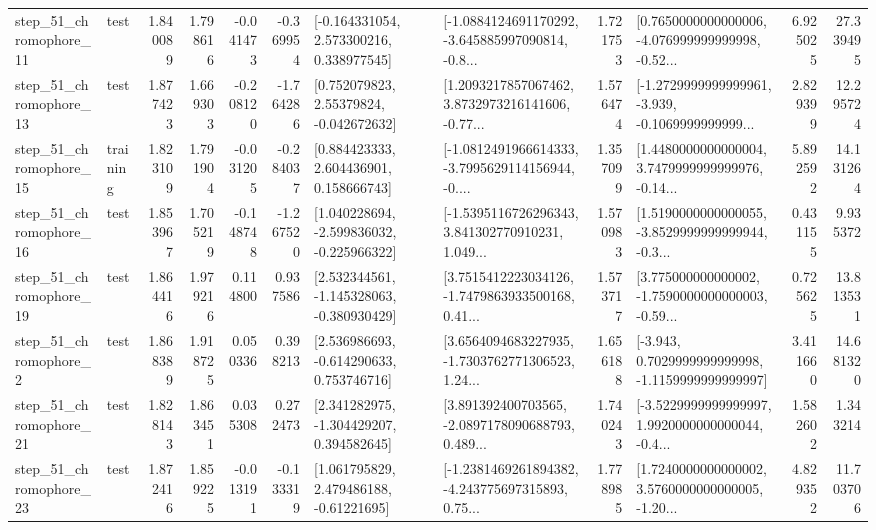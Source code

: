 \begin{tabular}{llrrrrllrlrr}
   step\_51\_chromophore\_11 &      test &      1.840089 &    1.798616 &     -0.041473 & -0.369954 &    [-0.164331054, 2.573300216, 0.338977545] &  [-1.0884124691170292, -3.645885997090814, -0.8... &       1.721753 &  [0.7650000000000006, -4.076999999999998, -0.52... &            6.925025 &         27.339495 \\
   step\_51\_chromophore\_13 &      test &      1.877423 &    1.669303 &     -0.208120 & -1.764286 &     [0.752079823, 2.55379824, -0.042672632] &  [1.2093217857067462, 3.8732973216141606, -0.77... &       1.576474 &  [-1.2729999999999961, -3.939, -0.1069999999999... &            2.829399 &         12.295724 \\
   step\_51\_chromophore\_15 &  training &      1.823109 &    1.791904 &     -0.031205 & -0.284037 &     [0.884423333, 2.604436901, 0.158666743] &  [-1.0812491966614333, -3.7995629114156944, -0.... &       1.357099 &  [1.4480000000000004, 3.7479999999999976, -0.14... &            5.892592 &         14.131264 \\
   step\_51\_chromophore\_16 &      test &      1.853967 &    1.705219 &     -0.148748 & -1.267520 &   [1.040228694, -2.599836032, -0.225966322] &  [-1.5395116726296343, 3.841302770910231, 1.049... &       1.570983 &  [1.5190000000000055, -3.8529999999999944, -0.3... &            0.431155 &          9.935372 \\
   step\_51\_chromophore\_19 &      test &      1.864416 &    1.979216 &      0.114800 &  0.937586 &   [2.532344561, -1.145328063, -0.380930429] &  [3.7515412223034126, -1.7479863933500168, 0.41... &       1.573717 &  [3.775000000000002, -1.7590000000000003, -0.59... &            0.725625 &         13.813531 \\
    step\_51\_chromophore\_2 &      test &      1.868389 &    1.918725 &      0.050336 &  0.398213 &    [2.536986693, -0.614290633, 0.753746716] &  [3.6564094683227935, -1.7303762771306523, 1.24... &       1.656188 &  [-3.943, 0.7029999999999998, -1.1159999999999997] &            3.411660 &         14.681320 \\
   step\_51\_chromophore\_21 &      test &      1.828143 &    1.863451 &      0.035308 &  0.272473 &    [2.341282975, -1.304429207, 0.394582645] &  [3.891392400703565, -2.0897178090688793, 0.489... &       1.740243 &  [-3.5229999999999997, 1.9920000000000044, -0.4... &            1.582602 &          1.343214 \\
   step\_51\_chromophore\_23 &      test &      1.872416 &    1.859225 &     -0.013191 & -0.133319 &     [1.061795829, 2.479486188, -0.61221695] &  [-1.2381469261894382, -4.243775697315893, 0.75... &       1.778985 &  [1.7240000000000002, 3.5760000000000005, -1.20... &            4.829352 &         11.703706 \\

\end{tabular}
